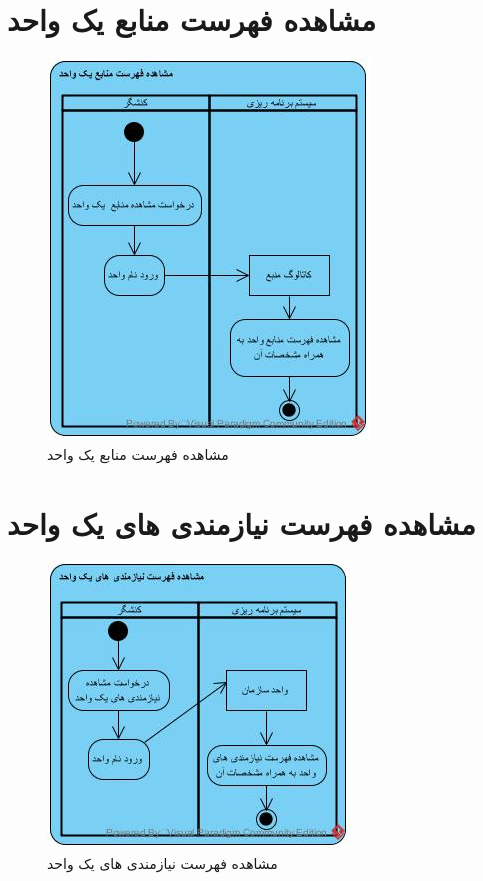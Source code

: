 \section{مشاهده فهرست منابع یک واحد}
\begin{figure}[H]
	\centering
	\includegraphics[scale=1]{img/activity/ViewListOfResources}
	\caption{مشاهده فهرست منابع یک واحد}
\end{figure}

\section{مشاهده فهرست نیازمندی های یک واحد}
\begin{figure}[H]
	\centering
	\includegraphics[scale=1]{img/activity/ViewListOfRequirements}
	\caption{مشاهده فهرست نیازمندی های یک واحد}
\end{figure}


